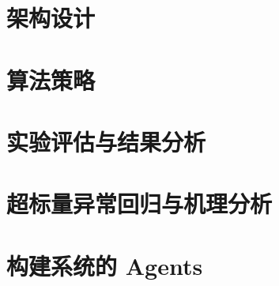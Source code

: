 \section{架构设计}





\section{算法策略}







\section{实验评估与结果分析}



\section{超标量异常回归与机理分析}




\section{构建系统的 Agents}





